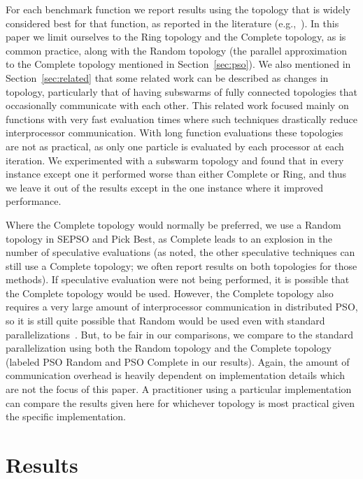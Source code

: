 \documentclass[smallcondensed]{svjour3}
\renewcommand{\sec}[1]{Section~\ref{sec:#1}}
\begin{document}
For each benchmark function we report results using the topology that is widely
considered best for that function, as reported in the literature
(e.g.,~\cite{bratton-2007-defining-a-standard-for-pso}).  In this paper we
limit ourselves to the Ring topology and the Complete topology, as is common
practice, along with the Random topology (the parallel approximation to the
Complete topology mentioned in \sec{pso}).  We also mentioned in \sec{related}
that some related work can be described as changes in topology, particularly
that of having subswarms of fully connected topologies that occasionally
communicate with each other.  This related work focused mainly on functions
with very fast evaluation times where such techniques drastically reduce
interprocessor communication.  With long function evaluations these topologies
are not as practical, as only one particle is evaluated by each processor at
each iteration.  We experimented with a subswarm topology and found that in
every instance except one it performed worse than either Complete or Ring, and
thus we leave it out of the results except in the one instance where it
improved performance.

Where the Complete topology would normally be preferred, we use a Random
topology in SEPSO and Pick Best, as Complete leads to an explosion in the
number of speculative evaluations (as noted, the other speculative techniques
can still use a Complete topology; we often report results on both topologies
for those methods).  If speculative evaluation were not being performed, it is
possible that the Complete topology would be used.  However, the Complete
topology also requires a very large amount of interprocessor communication in
distributed PSO, so it is still quite possible that Random would be used even
with standard parallelizations~\citep{mcnabb-2009-large-particle-swarms}.  But,
to be fair in our comparisons, we compare to the standard parallelization using
both the Random topology and the Complete topology (labeled PSO Random and PSO
Complete in our results).  Again, the amount of communication overhead is
heavily dependent on implementation details which are not the focus of this
paper.  A practitioner using a particular implementation can compare the
results given here for whichever topology is most practical given the specific
implementation.

\section{Results}
\label{sec:results}
\end{document}

